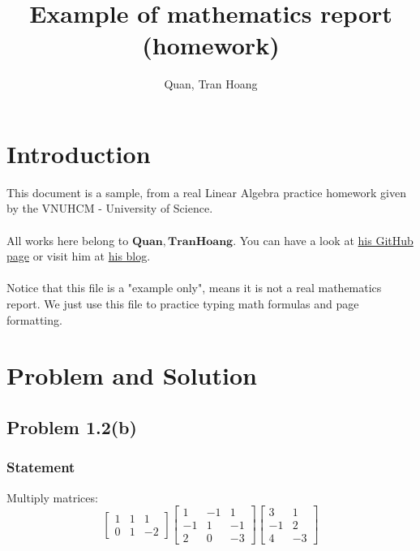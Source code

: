 \documentclass{article}
\begin{document}
    \title{Example of mathematics report (homework)}
    \author{Quan, Tran Hoang}
    \maketitle

    \section{Introduction}

    This document is a sample, from a real Linear Algebra practice homework given by the VNUHCM - University of Science.
    \\\\
    All works here belong to $\mathbf{Quan, Tran Hoang}$. You can have a look at \href{https://github.com/trhgquan}{his GitHub page} or visit him at \href{https://www.tranhoangquan.codes}{his blog}.
    \\\\
    Notice that this file is a "example only", means it is not a real mathematics report. We just use this file to practice typing math formulas and page formatting.

    \section{Problem and Solution}
        \subsection{Problem 1.2(b)}
            \subsubsection{Statement}
                Multiply matrices:
                \begin{equation*}
                    \begin{bmatrix}1 & 1 & 1 \\ 0 & 1 & -2\end{bmatrix}
                    \begin{bmatrix}1 & -1 & 1 \\ -1 & 1 & -1 \\ 2 & 0 & -3\end{bmatrix}
                    \begin{bmatrix}3 & 1 \\ -1 & 2 \\ 4 & -3\end{bmatrix}
                \end{equation*}
\end{document}
